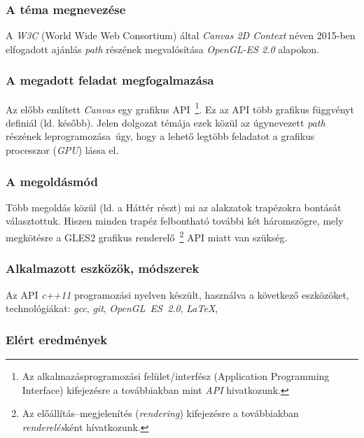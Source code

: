 \documentclass[12pt]{report}
\theoremstyle{definition}
\begin{document}

    \subsubsection*{A téma megnevezése}

  A \emph{W3C} (World Wide Web Consortium) által \emph{Canvas 2D
Context} néven 2015-ben elfogadott ajánlás \emph{path} részének
megvalósítása \emph{OpenGL-ES 2.0} alapokon.

    \subsubsection*{A megadott feladat megfogalmazása}

  Az előbb említett \emph{Canvas} egy grafikus API~\footnote{Az
alkalmazásprogramozási felület/interfész (Application Programming Interface)
kifejezésre a továbbiakban mint \emph{API} hivatkozunk.}.
  Ez az API több grafikus függvényt definiál (ld. később).
  Jelen dolgozat témája ezek közül az úgynevezett \emph{path} részének
leprogramozása~úgy, hogy a lehető legtöbb feladatot a grafikus processzor
(\textit{GPU}) lássa el.

    \subsubsection*{A megoldásmód}

  Több megoldás közül (ld. a Háttér részt) mi az alakzatok trapézokra
bontását választottuk. Hiszen minden trapéz felbontható további két
háromszögre, mely megkötésre a GLES2 grafikus renderelő~\footnote{Az
előállítás--megjelenítés (\emph{rendering}) kifejezésre a továbbiakban
\emph{renderelés}ként hívatkozunk.} API miatt van szükség.

    \subsubsection*{Alkalmazott eszközök, módszerek}

  Az API \emph{c++11} programozási nyelven készült, használva a következő
eszközöket, technológiákat: \emph{gcc}, \emph{git}, \textit{OpenGL~ES~2.0}, \emph{\LaTeX},

    \subsubsection*{Elért eredmények}
\end{document}
